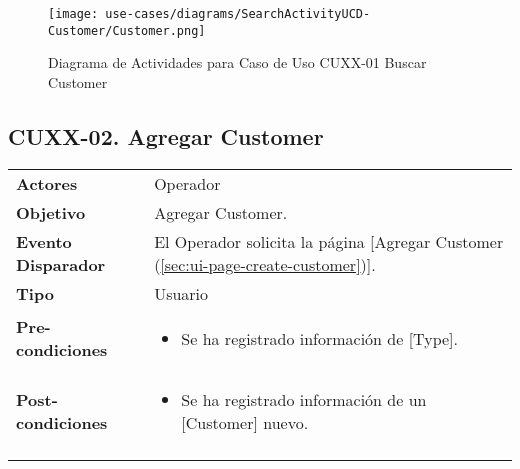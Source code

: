 	\begin{figure}[H]
		\begin{center}
			\label{tab:activity-search-ucd-entity-customer}
			\texttt{[image: use-cases/diagrams/SearchActivityUCD-Customer/Customer.png]}
			\caption{Diagrama de Actividades para Caso de Uso CUXX-01 Buscar Customer}
	\end{center}
	\end{figure}
	\clearpage
	\subsection{CUXX-02. Agregar Customer} \label{sec:cu-create-Customer}
	
	\begin{tabular}{ p{3.5cm} p{11.5cm} }
		\textbf{Actores} & Operador\\
		\textbf{Objetivo} & Agregar Customer.\\
		\textbf{Evento Disparador} & El Operador solicita la p\'agina [Agregar Customer (\ref{sec:ui-page-create-customer})].\\
		\textbf{Tipo} & Usuario\\
		\textbf{Pre-condiciones} &
			\begin{minipage}[t]{0.6\textwidth}
			\begin{itemize}[noitemsep,nolistsep]
			\setlength{\itemindent}{-.5cm}
				\item Se ha registrado informaci\'on de [Type].
			\end{itemize}
			\end{minipage} \\
		\textbf{Post-condiciones} &
			\begin{minipage}[t]{0.6\textwidth}
			\begin{itemize}[noitemsep,nolistsep]
			\setlength{\itemindent}{-.5cm}
				\item Se ha registrado informaci\'on de un [Customer] nuevo.
			\end{itemize}
			\end{minipage} \\
		\\
	\end{tabular}
	
